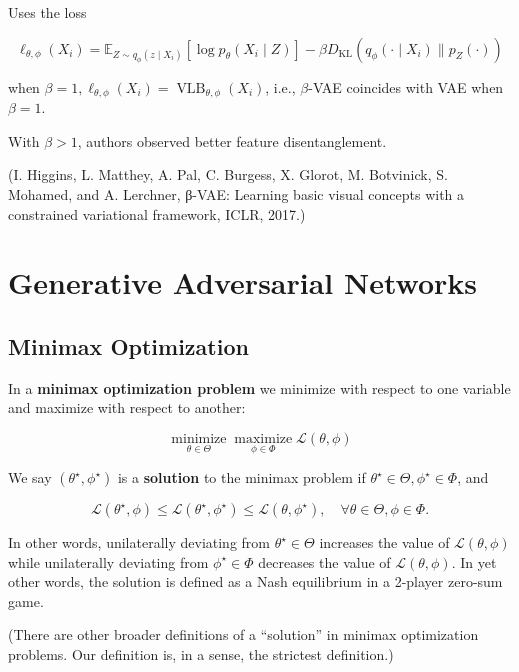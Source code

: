 \documentclass{report}
\begin{document}
\begin{concept}
    Uses the loss

    $$
    \ell_{\theta, \phi}\left(X_{i}\right)=\mathbb{E}_{Z \sim q_{\phi}\left(z \mid X_{i}\right)}\left[\log p_{\theta}\left(X_{i} \mid Z\right)\right]-\beta D_{\mathrm{KL}}\left(q_{\phi}\left(\cdot \mid X_{i}\right) \| p_{Z}(\cdot)\right)
    $$

    when $\beta=1, \ell_{\theta, \phi}\left(X_{i}\right)=\operatorname{VLB}_{\theta, \phi}\left(X_{i}\right)$, i.e., $\beta$-VAE coincides with VAE when $\beta=1$.

    With $\beta>1$, authors observed better feature disentanglement.

    (I. Higgins, L. Matthey, A. Pal, C. Burgess, X. Glorot, M. Botvinick, S. Mohamed, and A. Lerchner, β-VAE: Learning basic visual concepts with a constrained variational framework, ICLR, 2017.)
\end{concept}

\chapter{Generative Adversarial Networks}

\section{Minimax Optimization}

\begin{definition}
    In a \textbf{minimax optimization problem} we minimize with respect to one variable and maximize with respect to another:

    $$
    \underset{\theta \in \Theta}{\operatorname{minimize}} \underset{\phi \in \Phi}{\operatorname{maximize}} \mathcal{L}(\theta, \phi)
    $$

    We say $\left(\theta^{\star}, \phi^{\star}\right)$ is a \textbf{solution} to the minimax problem if $\theta^{\star} \in \Theta, \phi^{\star} \in \Phi$, and

    $$
    \mathcal{L}\left(\theta^{\star}, \phi\right) \leq \mathcal{L}\left(\theta^{\star}, \phi^{\star}\right) \leq \mathcal{L}\left(\theta, \phi^{\star}\right), \quad \forall \theta \in \Theta, \phi \in \Phi .
    $$

    In other words, unilaterally deviating from $\theta^{\star} \in \Theta$ increases the value of $\mathcal{L}(\theta, \phi)$ while unilaterally deviating from $\phi^{\star} \in \Phi$ decreases the value of $\mathcal{L}(\theta, \phi)$. In yet other words, the solution is defined as a Nash equilibrium in a 2-player zero-sum game.

    (There are other broader definitions of a “solution” in minimax optimization problems. Our definition is, in a sense, the strictest definition.)
\end{definition}
\end{document}
